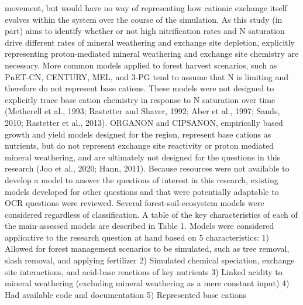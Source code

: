 \documentclass{article}
\begin{document}
movement, but would have no way of representing how cationic exchange itself evolves within
the system over the course of the simulation. As this study (in part) aims to identify whether or
not high nitrification rates and N saturation drive different rates of mineral weathering and
exchange site depletion, explicitly representing proton-mediated mineral weathering and
exchange site chemistry are necessary. More common models applied to forest harvest scenarios,
such as PnET-CN, CENTURY, MEL, and 3-PG tend to assume that N is limiting and therefore
do not represent base cations. These models were not designed to explicitly trace base cation
chemistry in response to N saturation over time (Metherell et al., 1993; Rastetter and Shaver,
1992; Aber et al., 1997; Sands, 2010; Rastetter et al., 2013). ORGANON and CIPSANON,
empirically based growth and yield models designed for the region, represent base cations as
nutrients, but do not represent exchange site reactivity or proton mediated mineral weathering,
and are ultimately not designed for the questions in this research (Joo et al., 2020; Hann, 2011).
Because resources were not available to develop a model to answer the questions of interest in
this research, existing models developed for other questions and that were potentially adaptable
to OCR questions were reviewed. Several forest-soil-ecosystem models were considered
regardless of classification. A table of the key characteristics of each of the main-assessed
models are described in Table 1. Models were considered applicative to the research question at
hand based on 5 characteristics:
1) Allowed for forest management scenarios to be simulated, such as tree removal, slash
removal, and applying fertilizer
2) Simulated chemical speciation, exchange site interactions, and acid-base reactions of key
nutrients
3) Linked acidity to mineral weathering (excluding mineral weathering as a mere constant input)
4) Had available code and documentation
5) Represented base cations
\end{document}
